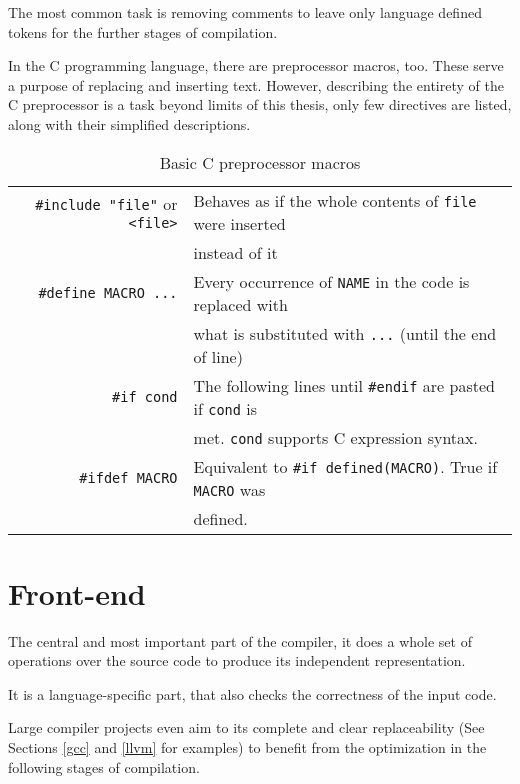     The most common task is removing comments to leave only language defined tokens for the further stages of compilation.

    In the C programming language, there are preprocessor macros, too. These serve a purpose of replacing and inserting text. However, describing the entirety of the C preprocessor is a task beyond limits of this thesis, only few directives are listed, along with their simplified descriptions.\cite{GnuCppWeb}

    \begin{table}[H]
    \begin{tabular}{r|l}
        \verb|#include "file"| or \verb|<file>| & Behaves as if the whole contents of \verb|file| were inserted \\
        & instead of it\\
        \verb|#define MACRO ...| & Every occurrence of \verb|NAME| in the code is replaced with \\
        & what is substituted with \verb|...| (until the end of line)\\
        \verb|#if cond| & The following lines until \verb|#endif| are pasted if \verb|cond| is\\
        & met. \verb|cond| supports C expression syntax.\\
        \verb|#ifdef MACRO| & Equivalent to \verb|#if defined(MACRO)|. True if \verb|MACRO| was\\
        & defined.
    \end{tabular}
    \caption{Basic C preprocessor macros}
    \end{table}

    \section{Front-end}

        The central and most important part of the compiler, it does a whole set of operations over the source code to produce its independent representation.

        It is a language-specific part, that also checks the correctness of the input code.

        Large compiler projects even aim to its complete and clear replaceability (See Sections \ref{gcc} and \ref{llvm} for examples) to benefit from the optimization in the following stages of compilation.


